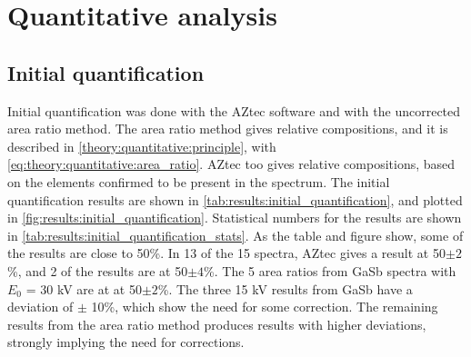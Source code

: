 
\clearpage

















\section{Quantitative analysis}
\label{results:quantitative}




\subsection{Initial quantification}
\label{results:initial_quantification}

Initial quantification was done with the AZtec software and with the uncorrected area ratio method.
The area ratio method gives relative compositions, and it is described in \cref{theory:quantitative:principle}, with \cref{eq:theory:quantitative:area_ratio}.
AZtec too gives relative compositions, based on the elements confirmed to be present in the spectrum.
The initial quantification results are shown in \cref{tab:results:initial_quantification}, and plotted in \cref{fig:results:initial_quantification}.
Statistical numbers for the results are shown in \cref{tab:results:initial_quantification_stats}.
As the table and figure show, some of the results are close to 50\%.
In 13 of the 15 spectra, AZtec gives a result at 50$\pm2$\%, and 2 of the results are at 50$\pm4$\%.
The 5 area ratios from GaSb spectra with $E_0$ = 30 kV are at at 50$\pm2$\%.
The three 15 kV results from GaSb have a deviation of $\pm$ 10\%, which show the need for some correction.
The remaining results from the area ratio method produces results with higher deviations, strongly implying the need for corrections.


